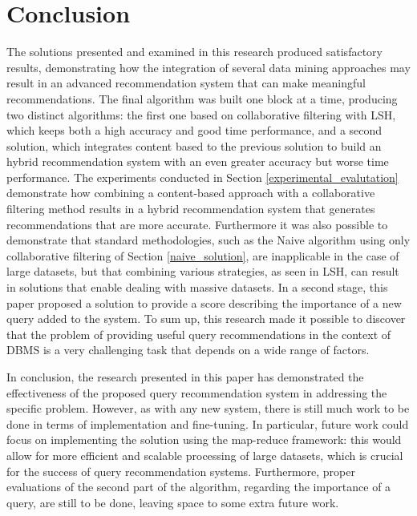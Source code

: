 \section{Conclusion}

The solutions presented and examined in this research produced satisfactory results, demonstrating how the integration of several data mining approaches may result in an advanced recommendation system that can make meaningful recommendations. The final algorithm was built one block at a time, producing two distinct algorithms: the first one based on collaborative filtering with LSH, which keeps both a high accuracy and good time performance, and a second solution, which integrates content based to the previous solution to build an hybrid recommendation system with an even greater accuracy but worse time performance. The experiments conducted in Section \ref{experimental_evalutation} demonstrate how combining a content-based approach with a collaborative filtering method results in a hybrid recommendation system that generates recommendations that are more accurate. Furthermore it was also possible to demonstrate that standard methodologies, such as the Naive algorithm using only collaborative filtering of Section \ref{naive_solution}, are inapplicable in the case of large datasets, but that combining various strategies, as seen in LSH, can result in solutions that enable dealing with massive datasets. In a second stage, this paper proposed a solution to provide a score describing the importance of a new query added to the system. To sum up, this research made it possible to discover that the problem of providing useful query recommendations in the context of DBMS is a very challenging task that depends on a wide range of factors. 


In conclusion, the research presented in this paper has demonstrated the effectiveness of the proposed query recommendation system in addressing the specific problem. However, as with any new system, there is still much work to be done in terms of implementation and fine-tuning. In particular, future work could focus on implementing the solution using the map-reduce framework: this would allow for more efficient and scalable processing of large datasets, which is crucial for the success of query recommendation systems. Furthermore,  proper evaluations of the second part of the algorithm, regarding the importance of a query, are still to be done, leaving space to some extra future work.